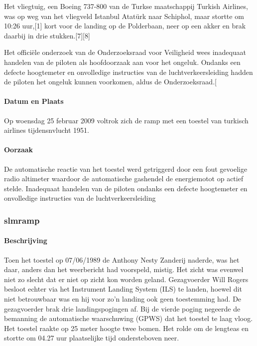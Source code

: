 \documentclass{article}
\begin{document}
	Het vliegtuig, een Boeing 737-800 van de Turkse maatschappij Turkish Airlines, was op weg van het vliegveld Istanbul Atatürk naar Schiphol, maar stortte om 10:26 uur,[1] kort voor de landing op de Polderbaan, neer op een akker en brak daarbij in drie stukken.[7][8]
	
	Het officiële onderzoek van de Onderzoeksraad voor Veiligheid wees inadequaat handelen van de piloten als hoofdoorzaak aan voor het ongeluk. Ondanks een defecte hoogtemeter en onvolledige instructies van de luchtverkeersleiding hadden de piloten het ongeluk kunnen voorkomen, aldus de Onderzoeksraad.[
	\paragraph{Datum en Plaats}
	
	\newline \indent  Op woensdag 25 februar 2009 voltrok zich de  ramp met een toestel van turkisch airlines tijdensnvlucht 1951.
	\paragraph{Oorzaak}
	De automatische reactie van het toestel werd getriggerd door een fout gevoelige radio altimeter waardoor de automatische gashendel de energiemotot op actief stelde.
	Inadequaat handelen van de piloten ondanks een defecte hoogtemeter en onvolledige instructies van de luchtverkeersleiding
	\subsubsection{slmramp}
	\paragraph{Beschrijving}
	Toen het toestel op 07/06/1989 de Anthony Nesty Zanderij naderde, was het daar, anders dan het weerbericht had voorspeld, mistig. Het zicht was evenwel niet zo slecht dat er niet op zicht kon worden geland. Gezagvoerder Will Rogers besloot echter via het Instrument Landing System (ILS) te landen, hoewel dit niet betrouwbaar was en hij voor zo'n landing ook geen toestemming had. De gezagvoerder brak drie landingspogingen af. Bij de vierde poging negeerde de bemanning de automatische waarschuwing (GPWS) dat het toestel te laag vloog. Het toestel raakte op 25 meter hoogte twee bomen. Het rolde om de lengteas en stortte om 04.27 uur plaatselijke tijd ondersteboven neer.
\end{document}
